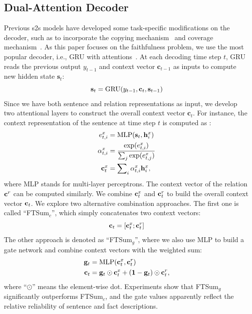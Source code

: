 \documentclass[letterpaper]{article} %
\begin{document}
	\subsection{Dual-Attention Decoder}
	Previous s2s models have developed some task-specific modifications on the decoder, such as to incorporate  the copying mechanism~\cite{gu2016incorporating} and coverage mechanism~\cite{see2017get}.
	As this paper focuses on the faithfulness problem, we use the most popular decoder, i.e., GRU with attentions~\cite{bahdanau2014neural}.
	At each decoding time step $t$, GRU reads the previous output $y_{t - 1}$ and context vector ${{\mathbf{c}}_{t - 1}}$ as inputs to compute new hidden state $\mathbf{s}_t$:
	\begin{equation}
		{{\bf{s}}_t} = {\rm{GRU}}({y_{t - 1}},{{\bf{c}}_t},{{\bf{s}}_{t - 1}})
	\end{equation}
	Since we have both sentence and relation representations as input, we develop two attentional layers to construct the overall context vector ${{\mathbf{c}}_{t}}$. 
	For instance, the context representation of the sentence at time step $t$ is computed as \cite{luong2015effective}:
	\begin{align}
		{e_{t,i}^x} &= \text{MLP}({{\bf{s}}_{t}},{{\bf{h}}_i^x})\\
		{\alpha _{t,i}^x} &= \frac{{\exp ({e_{t,i}^x})}}{{\sum\nolimits_j {\exp ({e_{t,j}^x})} }} \\
		{{\bf{c}}_t^x} &= \sum\nolimits_i {{\alpha _{t,i}^x}{{\bf{h}}_i^x}}, 
	\end{align}
	where MLP stands for multi-layer perceptrons.
	The context vector of the relation ${\bf{c}}^r$ can be computed similarly.
	We combine ${\bf{c}}_t^x$ and ${\bf{c}}_t^r$ to build the overall context vector ${\bf{c}}_t$.
	We explore two alternative combination approaches.
	The first one is called ``FTSum$_c$'', which simply concatenates two context vectors: 
	\begin{equation}\label{eq:context_concate}
		{{\bf{c}}_t} = [{\bf{c}}_t^x;{\bf{c}}_t^r]
	\end{equation}
	The other approach is denoted as ``FTSum$_g$'', where we also use MLP to build a gate network and combine context vectors with the weighted sum:
	\begin{align}
		{{\bf{g}}_t} &= {\rm{MLP}}({\bf{c}}_t^x,{\bf{c}}_t^r) \label{eq:context_gate}\\
		{{\bf{c}}_t} &= {{\bf{g}}_t} \odot {\bf{c}}_t^x + ({\bf{1}} - {{\bf{g}}_t}) \odot {\bf{c}}_t^r,
	\end{align}
	where ``$\odot$'' means the element-wise dot.
	Experiments show that FTSum$_g$ significantly outperforms FTSum$_c$, and the gate values apparently reflect the relative reliability of sentence and fact descriptions. 
	
\end{document}
